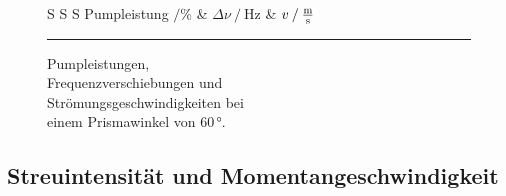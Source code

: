 \begin{figure} 
    \begin{minipage}[t]{.5\textwidth}
    \centering
    \begin{table}[H]
        \centering
        \captionsetup{justification=centering}
        \caption{Pumpleistungen, \\Frequenzverschiebungen und \\ Strömungsgeschwindigkeiten bei \\ einem Prismawinkel von $60 \,°$.}
        \label{tab:1winkel3} 
       \begin{tabular}{S S S}
        \toprule 
        {Pumpleistung $\mathbin{/}\%$} & {$\Delta \nu \mathbin{/} \unit{\hertz}$} & {$v \mathbin{/} \unit{\frac{\meter}{\second}}$}  \\
        \midrule 
        \bottomrule
       \end{tabular} 
    \end{table}
    \end{minipage}
    \begin{minipage}[t]{.5\textwidth} 
        \centering
        \vspace*{0pt}\rule{.95\textwidth}{12em} %
        \captionsetup{justification=centering}
    \end{minipage} 
\end{figure} 

\subsection{Streuintensität und Momentangeschwindigkeit}

